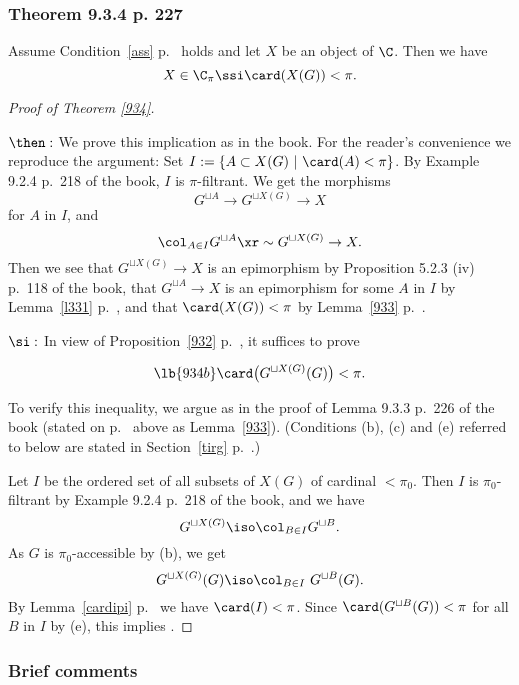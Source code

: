 \documentclass[12pt]{article}
\theoremstyle{remark}
\theoremstyle{definition}
\begin{document}
\subsubsection{Theorem 9.3.4 p. 227}

\begin{thm}[Theorem 9.3.4 p.~227]
Assume Condition~\ref{ass} p.~ holds and let $X$ be an object of $\C$. Then we have 
$$
X\in\C_\pi\ssi\card(X(G))<\pi.
$$ 
\end{thm}

\begin{proof}[Proof of Theorem \ref{934}]${}$

\nn$\then:$ We prove this implication as in the book. For the reader's convenience we reproduce the argument: Set $I:=\{A\subset X(G)\ |\ \card(A)<\pi\}$. By Example 9.2.4 p.~218 of the book, $I$ is $\pi$-filtrant. We get the morphisms 
$$
G^{\sqcup A}\to G^{\sqcup X(G)}\to X
$$ 
for $A$ in $I$, and 
$$
\col_{A\in I}G^{\sqcup A}\xr\sim G^{\sqcup X(G)}\to X.
$$ 
Then we see that $G^{\sqcup X(G)}\to X$ is an epimorphism by Proposition 5.2.3 (iv) p.~118 of the book, that $G^{\sqcup A}\to X$ is an epimorphism for some $A$ in $I$ by Lemma~\ref{l331} p.~, and that $\card(X(G))<\pi$ by Lemma~\ref{933} p.~.

\nn$\si:$ In view of Proposition~\ref{932} p.~, it suffices to prove  

\begin{equation}\lb{934b}
\card\big(G^{\sqcup X(G)}(G)\big)<\pi.
\end{equation} 

To verify this inequality, we argue as in the proof of Lemma 9.3.3 p.~226 of the book (stated on p.~ above as Lemma~\ref{933}). (Conditions (b), (c) and (e) referred to below are stated in Section~\ref{tirg} p.~.)

Let $I$ be the ordered set of all subsets of $X(G)$ of cardinal $<\pi_0$. Then $I$ is $\pi_0$-filtrant by Example 9.2.4 p.~218 of the book, and we have 
$$
G^{\sqcup X(G)}\iso\col_{B\in I}G^{\sqcup B}.
$$ 
As $G$ is $\pi_0$-accessible by (b), we get 
$$
G^{\sqcup X(G)}(G)\iso\col_{B\in I}\ G^{\sqcup B}(G).
$$ 
By Lemma~\ref{cardipi} p.~ we have $\card(I)<\pi$. Since $\card(G^{\sqcup B}(G))<\pi$ for all $B$ in $I$ by (e), this implies .
\end{proof}

\subsubsection{Brief comments}
\end{document}

